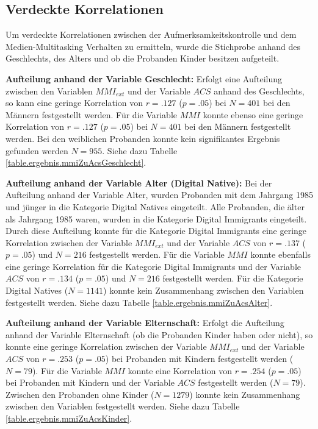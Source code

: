 \subsection{Verdeckte Korrelationen}
Um verdeckte Korrelationen zwischen der Aufmerksamkeitskontrolle und dem Medien-Multitasking Verhalten zu ermitteln, wurde die Stichprobe anhand des Geschlechts, des Alters und ob die Probanden Kinder besitzen aufgeteilt.
\par
\textbf{Aufteilung anhand der Variable Geschlecht:} Erfolgt eine Aufteilung zwischen den Variablen $MMI_{ext}$ und der Variable $ACS$ anhand des Geschlechts, so kann eine geringe Korrelation von $r=.127$ ($p=.05$) bei $N=401$ bei den Männern festgestellt werden. Für die Variable $MMI$ konnte ebenso eine geringe Korrelation von $r=.127$ ($p=.05$) bei $N=401$ bei den Männern festgestellt werden. Bei den weiblichen Probanden konnte kein signifikantes Ergebnis gefunden werden $N=955$. Siehe dazu Tabelle \ref{table.ergebnis.mmiZuAcsGeschlecht}.
\par
\textbf{Aufteilung anhand der Variable Alter (Digital Native):} Bei der Aufteilung anhand der Variable Alter, wurden Probanden mit dem Jahrgang 1985 und jünger in die Kategorie Digital Natives eingeteilt. Alle Probanden, die älter als Jahrgang 1985 waren, wurden in die Kategorie Digital Immigrants eingeteilt. Durch diese Aufteilung konnte für die Kategorie Digital Immigrants eine geringe Korrelation zwischen der Variable $MMI_{ext}$ und der Variable $ACS$ von $r=.137$ ($p=.05$) und $N=216$ festgestellt werden. Für die Variable $MMI$ konnte ebenfalls eine geringe Korrelation für die Kategorie Digital Immigrants und der Variable $ACS$ von $r=.134$ ($p=.05$) und $N=216$ festgestellt werden. Für die Kategorie Digital Natives ($N=1141$) konnte kein Zusammenhang zwischen den Variablen festgestellt werden. Siehe dazu Tabelle \ref{table.ergebnis.mmiZuAcsAlter}.
\par
\textbf{Aufteilung anhand der Variable Elternschaft:} Erfolgt die Aufteilung anhand der Variable Elternschaft (ob die Probanden Kinder haben oder nicht), so konnte eine geringe Korrelation zwischen der Variable $MMI_{ext}$ und der Variable $ACS$ von $r=.253$ ($p=.05$) bei Probanden mit Kindern festgestellt werden ($N=79$). Für die Variable $MMI$ konnte eine Korrelation von $r=.254$ ($p=.05$) bei Probanden mit Kindern und der Variable $ACS$ festgestellt werden ($N=79$). Zwischen den Probanden ohne Kinder ($N=1279$) konnte kein Zusammenhang zwischen den Variablen festgestellt werden. Siehe dazu Tabelle \ref{table.ergebnis.mmiZuAcsKinder}.

